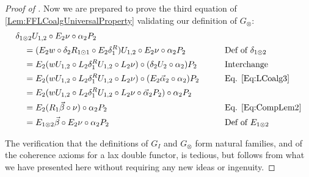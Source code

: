 \begin{proof}[Proof of ]
	Now we are prepared to prove the third equation of \cref{Lem:FFLCoalgUniversalProperty} validating our definition of $G_{\otimes}$:
	\begin{alignat*}{2}
		\hspace{1em}&\hspace{-1em} \delta_{1\otimes2}U_{1,2} \circ E_2\nu \circ \alpha_2P_2 && \\
		&= (E_2w \circ \delta_2R_{1\odot1} \circ E_2\delta_1^R)U_{1,2} \circ E_2\nu \circ \alpha_2P_2
			&& \text{Def of $\delta_{1\otimes2}$} \\
		&= E_2(wU_{1,2} \circ L_2\delta_1^RU_{1,2} \circ L_2\nu) \circ (\delta_2U_2 \circ \alpha_2)P_2
			&& \text{Interchange} \\
		&= E_2(wU_{1,2} \circ L_2\delta_1^RU_{1,2} \circ L_2\nu) \circ (E_2\vec{\alpha}_2 \circ \alpha_2)P_2
			&\qquad& \text{Eq. \eqref{Eq:LCoalg3}} \\
		&= E_2(wU_{1,2} \circ L_2\delta_1^RU_{1,2} \circ L_2\nu \circ \vec{\alpha}_2P_2) \circ \alpha_2P_2 && \\
		&= E_2(R_1\vec{\beta}\circ\nu) \circ \alpha_2P_2
			&& \text{Eq. \eqref{Eq:CompLem2}} \\
		&= E_{1\otimes 2}\vec{\beta} \circ E_2\nu \circ \alpha_2P_2
			&& \text{Def of $E_{1\otimes2}$}
	\end{alignat*}

	The verification that the definitions of $G_I$ and $G_{\otimes}$ form natural families, and of the coherence axioms for a lax double functor, is tedious, but follows from what we have presented here without requiring any new ideas or ingenuity.
\end{proof}

